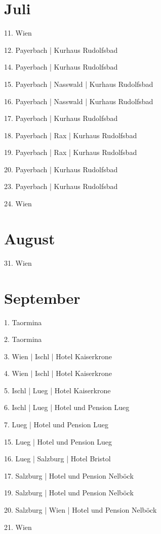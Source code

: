 \documentclass[twoside=false,titlepage=false,open=any, parskip=never, fontsize=10pt, headings=small, chapterprefix=false, appendixprefix=false, DIV=15]{scrbook}
\begin{document}
\begin{multicols}{3}
            \section*{Juli}
            11. Wien\par
            12. Payerbach | Kurhaus Rudolfsbad\par
            14. Payerbach | Kurhaus Rudolfsbad\par
            15. Payerbach | Nasswald | Kurhaus Rudolfsbad\par
            16. Payerbach | Nasswald | Kurhaus Rudolfsbad\par
            17. Payerbach | Kurhaus Rudolfsbad\par
            18. Payerbach | Rax | Kurhaus Rudolfsbad\par
            19. Payerbach | Rax | Kurhaus Rudolfsbad\par
            20. Payerbach | Kurhaus Rudolfsbad\par
            23. Payerbach | Kurhaus Rudolfsbad\par
            24. Wien\par
            \section*{August}
            31. Wien\par
            \section*{September}
            1. Taormina\par
            2. Taormina\par
            3. Wien | Ischl | Hotel Kaiserkrone\par
            4. Wien | Ischl | Hotel Kaiserkrone\par
            5. Ischl | Lueg | Hotel Kaiserkrone\par
            6. Ischl | Lueg | Hotel und Pension Lueg\par
            7. Lueg | Hotel und Pension Lueg\par
            15. Lueg | Hotel und Pension Lueg\par
            16. Lueg | Salzburg | Hotel Bristol\par
            17. Salzburg | Hotel und Pension Nelböck\par
            19. Salzburg | Hotel und Pension Nelböck\par
            20. Salzburg | Wien | Hotel und Pension Nelböck\par
            21. Wien\par

\end{multicols}
\end{document}
